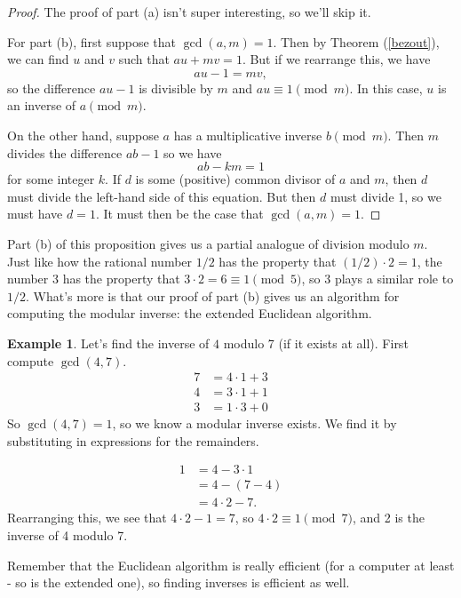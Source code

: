 \documentclass[12pt]{article}
\theoremstyle{plain}
\theoremstyle{definition}
\newtheorem{example}[theorem]{Example}
\theoremstyle{remark}
\begin{document}
\begin{proof}
    The proof of part (a) isn't super interesting, so we'll skip it.

    For part (b), first suppose that $\gcd(a,m) = 1$.
    Then by Theorem (\ref{bezout}), we can find $u$ and $v$ such that $au+mv = 1$.
    But if we rearrange this, we have
    \[
        au - 1 = mv,
    \]
    so the difference $au-1$ is divisible by $m$ and $au\equiv 1\pmod m$.
    In this case, $u$ is an inverse of $a\pmod m$.

    On the other hand, suppose $a$ has a multiplicative inverse $b\pmod m$.
    Then $m$ divides the difference $ab-1$ so we have
    \[
        ab - km = 1
    \]
    for some integer $k$.
    If $d$ is some (positive) common divisor of $a$ and $m$, then $d$ must divide the left-hand side of this equation.
    But then $d$ must divide 1, so we must have $d = 1$.
    It must then be the case that $\gcd(a, m) = 1$.
\end{proof}

Part (b) of this proposition gives us a partial analogue of division modulo $m$.
Just like how the rational number $1/2$ has the property that $(1/2)\cdot 2 = 1$, the number $3$ has the property that $3\cdot 2 = 6 \equiv 1\pmod 5$, so $3$ plays a similar role to $1/2$.
What's more is that our proof of part (b) gives us an algorithm for computing the modular inverse: the extended Euclidean algorithm.

\begin{example}
    Let's find the inverse of $4$ modulo 7 (if it exists at all).
    First compute $\gcd(4, 7)$.
    \begin{align*}
        7 &= 4\cdot 1 + 3\\
        4 &= 3\cdot 1 + 1\\
        3 &= 1\cdot 3 + 0
    \end{align*}
    So $\gcd(4, 7) = 1$, so we know a modular inverse exists.
    We find it by substituting in expressions for the remainders.

    \begin{align*}
        1 &= 4 - 3\cdot 1\\
          &= 4 - (7-4)\\
          &= 4\cdot 2 - 7.
    \end{align*}
    Rearranging this, we see that $4\cdot 2 - 1 = 7$, so $4\cdot 2\equiv 1\pmod 7$, and 2 is the inverse of 4 modulo 7.
\end{example}

Remember that the Euclidean algorithm is really efficient (for a computer at least - so is the extended one), so finding inverses is efficient as well.
\end{document}
